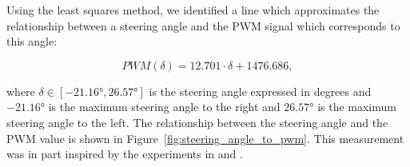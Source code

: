 Using the least squares method, we identified a line which approximates the relationship between a steering angle and the \gls*{PWM} signal which corresponds to this angle:

\begin{equation}
PWM(\delta)=12.701\cdot\delta + 1476.686,
\end{equation}

where $\delta\in\left[\ang{-21.16}, \ang{26.57}\right]$ is the steering angle expressed in degrees and $\ang{-21.16}$ is the maximum steering angle to the right and $\ang{26.57}$ is the maximum steering angle to the left. The relationship between the steering angle and the \gls*{PWM} value is shown in Figure~\ref{fig:steering_angle_to_pwm}. This measurement was in part inspired by the experiments in \cite{ctu_martin_vajnar} and \cite{rc_identification}.

